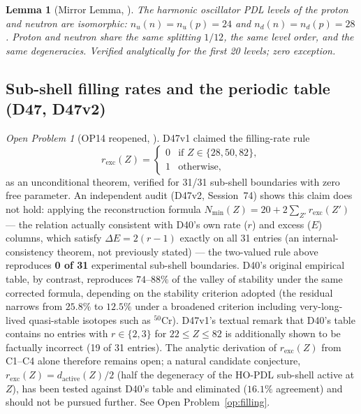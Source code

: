 \documentclass[11pt,a4paper]{article}
\theoremstyle{plain}
\newtheorem{lemma}[theorem]{Lemma}
\theoremstyle{definition}
\theoremstyle{remark}
\newtheorem{openproblem}[theorem]{Open Problem}
\newcommand{\rexc}{r_{\mathrm{exc}}}
\newcommand{\Nmin}{N_{\min}}
\begin{document}
\begin{lemma}[Mirror Lemma, \cite{D47}]
\label{lem:mirror}
The harmonic oscillator PDL levels of the proton and neutron are isomorphic: $n_u(n) = n_u(p) = 24$ and $n_d(n) = n_d(p) = 28$. Proton and neutron share the same splitting $1/12$, the same level order, and the same degeneracies. Verified analytically for the first 20 levels; zero exception.
\end{lemma}

\subsection{Sub-shell filling rates and the periodic table (D47, D47v2)}
\label{subsec:fillingrates}

\begin{openproblem}[OP14 reopened, \cite{D47v2}]
\label{thm:fillingrates}
D47v1 claimed the filling-rate rule
\begin{equation}
r_{\mathrm{exc}}(Z) = \begin{cases} 0 & \text{if } Z \in \{28, 50, 82\},\\ 1 & \text{otherwise,} \end{cases}
\end{equation}
as an unconditional theorem, verified for 31/31 sub-shell boundaries with zero free parameter. An independent audit (D47v2, Session~74) shows this claim does not hold: applying the reconstruction formula $\Nmin(Z) = 20 + 2\sum_{Z'} \rexc(Z')$ --- the relation actually consistent with D40's own rate ($r$) and excess ($E$) columns, which satisfy $\Delta E = 2(r-1)$ exactly on all 31 entries (an internal-consistency theorem, not previously stated) --- the two-valued rule above reproduces \textbf{0 of 31} experimental sub-shell boundaries. D40's original empirical table, by contrast, reproduces $74$--$88\%$ of the valley of stability under the same corrected formula, depending on the stability criterion adopted (the residual narrows from $25.8\%$ to $12.5\%$ under a broadened criterion including very-long-lived quasi-stable isotopes such as $^{50}$Cr). D47v1's textual remark that D40's table contains no entries with $r\in\{2,3\}$ for $22\le Z\le82$ is additionally shown to be factually incorrect (19 of 31 entries). The analytic derivation of $\rexc(Z)$ from C1--C4 alone therefore remains open; a natural candidate conjecture, $\rexc(Z) = d_{\mathrm{active}}(Z)/2$ (half the degeneracy of the HO-PDL sub-shell active at $Z$), has been tested against D40's table and eliminated ($16.1\%$ agreement) and should not be pursued further. See Open Problem~\ref{op:filling}.
\end{openproblem}
\end{document}
